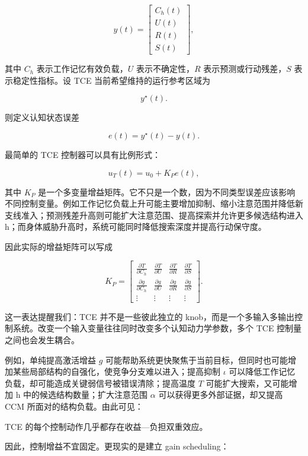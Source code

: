 \[
y(t)
=
\begin{bmatrix}
C_h(t)\\
U(t)\\
R(t)\\
S(t)
\end{bmatrix},
\]

其中 $C_h$ 表示工作记忆有效负载，$U$ 表示不确定性，$R$ 表示预测或行动残差，$S$ 表示稳定性指标。设 TCE 当前希望维持的运行参考区域为

\[
y^\star(t).
\]

则定义认知状态误差

\[
e(t)=y^\star(t)-y(t).
\]

最简单的 TCE 控制器可以具有比例形式：

\[
u_T(t)
=
u_0
+
K_P e(t),
\]

其中 $K_P$ 是一个多变量增益矩阵。它不只是一个数，因为不同类型误差应该影响不同控制变量。例如工作记忆负载上升可能主要增加抑制、缩小注意范围并降低新支线准入；预测残差升高则可能扩大注意范围、提高探索并允许更多候选结构进入 h；而身体威胁升高时，系统可能同时降低搜索深度并提高行动保守度。

因此实际的增益矩阵可以写成

\[
K_P=
\begin{bmatrix}
\frac{\partial T}{\partial C_h} &
\frac{\partial T}{\partial U} &
\frac{\partial T}{\partial R} &
\frac{\partial T}{\partial S}
\\
\frac{\partial g}{\partial C_h} &
\frac{\partial g}{\partial U} &
\frac{\partial g}{\partial R} &
\frac{\partial g}{\partial S}
\\
\vdots & \vdots & \vdots & \vdots
\end{bmatrix}.
\]

这一表达提醒我们：TCE 并不是一些彼此独立的 knob，而是一个多输入多输出控制系统。改变一个输入变量往往同时改变多个认知动力学参数，多个 TCE 控制量之间也会发生耦合。

例如，单纯提高激活增益 $g$ 可能帮助系统更快聚焦于当前目标，但同时也可能增加某些局部结构的自强化，使竞争分支难以进入；提高抑制 $\iota$ 可以降低工作记忆负载，却可能造成关键弱信号被错误清除；提高温度 $T$ 可能扩大搜索，又可能增加 h 中的候选结构数量；扩大注意范围 $\alpha$ 可以获得更多外部证据，却又提高 CCM 所面对的结构负载。由此可见：

\begin{remark}
TCE 的每个控制动作几乎都存在收益—负担双重效应。
\end{remark}

因此，控制增益不宜固定。更现实的是建立 gain scheduling：

